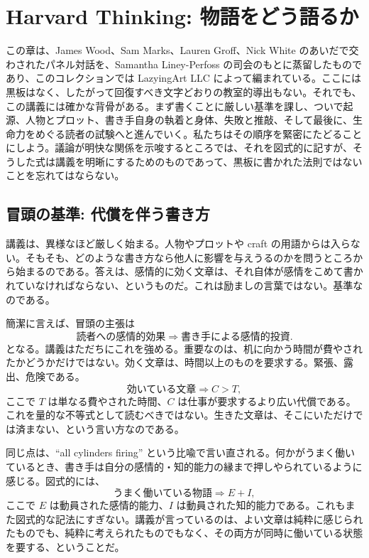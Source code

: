 \chapter{Harvard Thinking: 物語をどう語るか}

この章は、James Wood、Sam Marks、Lauren Groff、Nick White のあいだで交わされたパネル対話を、Samantha Liney-Perfoss の司会のもとに蒸留したものであり、このコレクションでは LazyingArt LLC によって編まれている。ここには黒板はなく、したがって回復すべき文字どおりの教室的導出もない。それでも、この講義には確かな背骨がある。まず書くことに厳しい基準を課し、ついで起源、人物とプロット、書き手自身の執着と身体、失敗と推敲、そして最後に、生命力をめぐる読者の試験へと進んでいく。私たちはその順序を緊密にたどることにしよう。議論が明快な関係を示唆するところでは、それを図式的に記すが、そうした式は講義を明晰にするためのものであって、黒板に書かれた法則ではないことを忘れてはならない。

\section{冒頭の基準: 代償を伴う書き方}

講義は、異様なほど厳しく始まる。人物やプロットや craft の用語からは入らない。そもそも、どのような書き方なら他人に影響を与えうるのかを問うところから始まるのである。答えは、感情的に効く文章は、それ自体が感情をこめて書かれていなければならない、というものだ。これは励ましの言葉ではない。基準なのである。

簡潔に言えば、冒頭の主張は
\begin{equation}
\text{読者への感情的効果} \Rightarrow \text{書き手による感情的投資}.
\end{equation}
となる。講義はただちにこれを強める。重要なのは、机に向かう時間が費やされたかどうかだけではない。効く文章は、時間以上のものを要求する。緊張、露出、危険である。
\begin{equation}
\text{効いている文章} \Rightarrow C > T,
\end{equation}
ここで \(T\) は単なる費やされた時間、\(C\) は仕事が要求するより広い代償である。これを量的な不等式として読むべきではない。生きた文章は、そこにいただけでは済まない、という言い方なのである。

同じ点は、``all cylinders firing'' という比喩で言い直される。何かがうまく働いているとき、書き手は自分の感情的・知的能力の縁まで押しやられているように感じる。図式的には、
\begin{equation}
\text{うまく働いている物語} \Rightarrow E + I,
\end{equation}
ここで \(E\) は動員された感情的能力、\(I\) は動員された知的能力である。これもまた図式的な記法にすぎない。講義が言っているのは、よい文章は純粋に感じられたものでも、純粋に考えられたものでもなく、その両方が同時に働いている状態を要する、ということだ。

